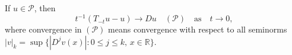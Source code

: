 If $u \in \mathcal{P}$, then
$$t^{-1}(T_{-t}u - u) \to Du \quad (\mathcal{P}) \quad \text{as} \quad t \to 0,$$
where convergence in $(\mathcal{P})$ means convergence with respect to all seminorms $|v|_k = \sup\{|D^j v(x)| : 0 \leq j \leq k, \, x \in \mathbb{R}\}$.
